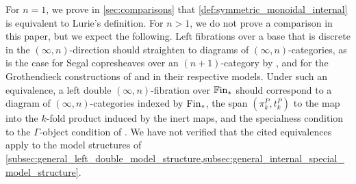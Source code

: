 \documentclass[10pt,reqno]{amsart}
\begin{document}
\begin{rmk}%
\label{rem:higher_n_comparison}
For $n=1$, we prove in \cref{sec:comparisons} that
\cref{def:symmetric_monoidal_internal} is equivalent to Lurie's
definition. For $n>1$, we do not prove a comparison in this paper,
but we expect the following. Left fibrations over a base that is
discrete in the $(\infty,n)$-direction should straighten to diagrams
of $(\infty,n)$-categories, as is the case for Segal copresheaves
over an $(n+1)$-category by \cite[Corollary~4.33]{Nuiten2023}, and
for the Grothendieck constructions of \cite{Rasekh2021Yoneda} and
\cite{moser2023inftyncategoricalstraighteningunstraighteningconstruction}
in their respective models. Under such an equivalence, a left double
$(\infty,n)$-fibration over $\mathbb{F}\mathrm{in}_*$ should correspond to a
diagram of $(\infty,n)$-categories indexed by $\mathrm{Fin}_*$, the span
$(\pi_k^P,t_k^P)$ to the map into the $k$-fold product induced by
the inert maps, and the specialness condition to the $\Gamma$-object
condition of \cite[Definition~3.3]{calaque2019cobordisms}. We have not
verified that the cited equivalences apply to the model structures of
\cref{subsec:general_left_double_model_structure,subsec:general_internal_special_model_structure}.
\end{rmk}
\end{document}
